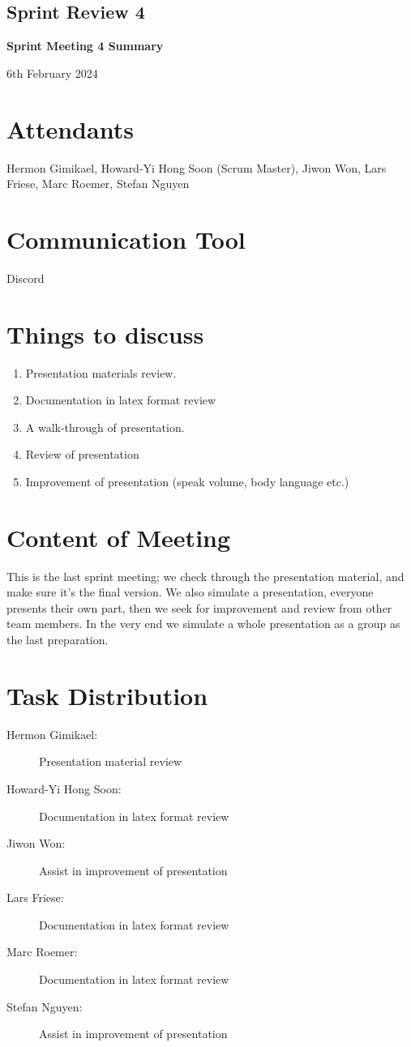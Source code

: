 \documentclass{article}
\begin{document}
\subsection{Sprint Review 4}
\begin{center}
    {\Large \textbf{Sprint Meeting 4 Summary}}
    
    \vspace{0.5cm}
    
    {\large 6th February 2024}
\end{center}
\section*{Attendants}
Hermon Gimikael, Howard-Yi Hong Soon (Scrum Master), Jiwon Won, Lars Friese, Marc Roemer, Stefan Nguyen

\section*{Communication Tool}
Discord

\section*{Things to discuss}
\begin{enumerate}
    \item Presentation materials review.
	\item Documentation in latex format review
	\item A walk-through of presentation.
	\item Review of presentation
	\item Improvement of presentation (speak volume, body language etc.)
	
\end{enumerate}

\section*{Content of Meeting}
This is the last sprint meeting; we check through the presentation material, and make sure it’s 
the final version. We also simulate a presentation, everyone presents their own part, 
then we seek for improvement and review from other team members. In the very end we simulate a whole presentation as a group as the last preparation. 
\section*{Task Distribution}
\begin{description}
    \item[Hermon Gimikael:] Presentation material review 
    \item[Howard-Yi Hong Soon:] Documentation in latex format review
    \item[Jiwon Won:] Assist in improvement of presentation
    \item[Lars Friese:] Documentation in latex format review
    \item[Marc Roemer:] Documentation in latex format review
    \item[Stefan Nguyen:] Assist in improvement of presentation
\end{description}
\end{document}
